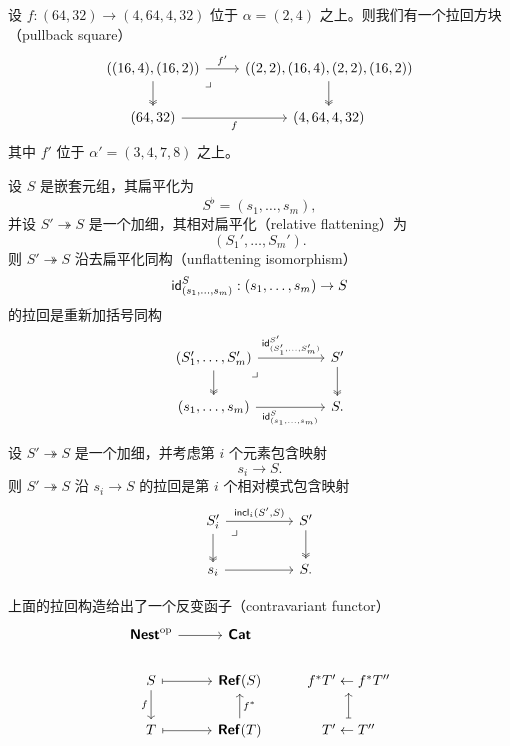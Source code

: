 \begin{example}
    设 $f:(64,32) \to (4,64,4,32)$ 位于 $\alpha = (2,4)$ 之上。则我们有一个拉回方块（pullback square）
    \[ \begin{tikzcd}
    ((16,4),(16,2)) \ar[d,two heads] \ar[r,"f'"] \arrow[dr, phantom, "\lrcorner", very near start] & ((2,2),(16,4),(2,2),(16,2)) \ar[d, two heads] \\
    (64,32) \ar[r,swap,"f"] & (4,64,4,32)
    \end{tikzcd} \]
    其中 $f'$ 位于 $\alpha' = (3,4,7,8)$ 之上。
\end{example}

\begin{example}
    设 $S$ 是嵌套元组，其扁平化为
    \[
    S^\flat = (s_1,\dots,s_m),
    \]
    并设 $S' \twoheadrightarrow S$ 是一个加细，其相对扁平化（relative flattening）为
    \[
    (S_1',\dots,S_m').
    \]
    则 $S' \twoheadrightarrow S$ 沿去扁平化同构（unflattening isomorphism）
    \[
    \mathsf{id}_{(s_1,\dots,s_m)}^S :(s_1,\dots,s_m) \to S
    \]
    的拉回是重新加括号同构
    \[ \begin{tikzcd}
    (S_1',\dots,S_m') \ar[rr,"\id_{(S_1'{,}\dots{,}S_m')}^{S'}"] \ar[d, two heads] \arrow[drr, phantom, "\lrcorner", very near start] & & S' \ar[d,two heads] \\
    (s_1,\dots,s_m) \ar[rr,swap,"\id_{(s_1{,}\dots{,}s_m)}^S"] & & S.
    \end{tikzcd}
    \]
\end{example}

\begin{example}
    设 $S' \twoheadrightarrow S$ 是一个加细，并考虑第 $i$ 个元素包含映射
    \[
    s_i \to S.
    \]
    则 $S' \twoheadrightarrow S$ 沿 $s_i \to S$ 的拉回是第 $i$ 个相对模式包含映射
        \[ \begin{tikzcd}
    S_i' \ar[rr,"\incl_i(S'{,}S)"] \ar[d, two heads] \arrow[drr, phantom, "\lrcorner", very near start] & & S' \ar[d,two heads] \\
    s_i \ar[rr,swap] & & S.
    \end{tikzcd}
    \]
\end{example}

\begin{observation}
    上面的拉回构造给出了一个反变函子（contravariant functor）
    \[ \begin{tikzcd}
\catstyle{Nest}^\text{op} \ar[r] & \catstyle{Cat} \\
    S \ar[r,mapsto] \ar[d,swap,"f"] & \catstyle{Ref}(S)  & f^*T' \leftarrow f^*T'' \\
    T \ar[r,mapsto]  & \catstyle{Ref}(T) \ar[u,swap,"f^*"] & T' \leftarrow T'' \ar[u,mapsto]
    \end{tikzcd} \]
\end{observation}


